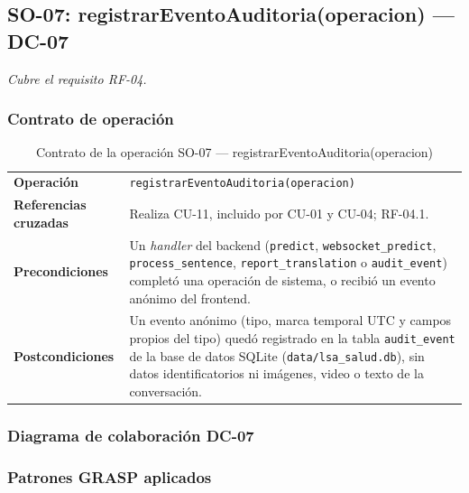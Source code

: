 \subsection{SO-07: registrarEventoAuditoria(operacion) --- DC-07}
\textit{Cubre el requisito RF-04.}

\subsubsection{Contrato de operación}

\begin{table}[H]
\centering
\begin{tabularx}{\textwidth}{@{}p{4.4cm} X@{}}
\toprule
\textbf{Operación} & \texttt{registrarEventoAuditoria(operacion)} \\
\textbf{Referencias cruzadas} & Realiza CU-11, incluido por CU-01 y CU-04; RF-04.1. \\
\textbf{Precondiciones} & Un \textit{handler} del backend (\texttt{predict},
\texttt{websocket\_predict}, \texttt{process\_sentence},
\texttt{report\_translation} o \texttt{audit\_event}) completó una
operación de sistema, o recibió un evento anónimo del frontend. \\
\textbf{Postcondiciones} & Un evento anónimo (tipo, marca temporal UTC y
campos propios del tipo) quedó registrado en la tabla \texttt{audit\_event}
de la base de datos SQLite (\texttt{data/lsa\_salud.db}), sin datos
identificatorios ni imágenes, video o texto de la conversación. \\
\bottomrule
\end{tabularx}
\caption{Contrato de la operación SO-07 --- registrarEventoAuditoria(operacion)}
\label{tab:col-contrato-so07}
\end{table}

\subsubsection{Diagrama de colaboración DC-07}


\subsubsection{Patrones GRASP aplicados}

